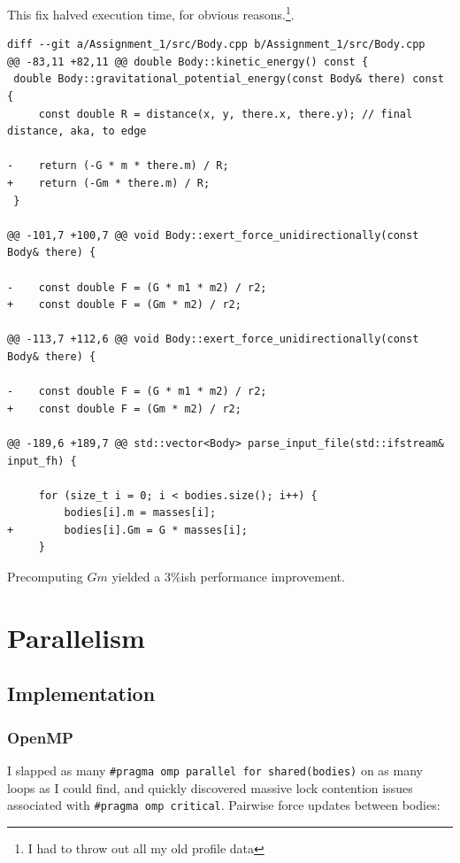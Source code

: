 \documentclass[11pt,a4paper]{article}
\begin{document}
This fix halved execution time, for obvious reasons.\footnote{I had to throw out all my old profile data}.

\begin{verbatim}
diff --git a/Assignment_1/src/Body.cpp b/Assignment_1/src/Body.cpp
@@ -83,11 +82,11 @@ double Body::kinetic_energy() const {
 double Body::gravitational_potential_energy(const Body& there) const {
     const double R = distance(x, y, there.x, there.y); // final distance, aka, to edge

-    return (-G * m * there.m) / R;
+    return (-Gm * there.m) / R;
 }

@@ -101,7 +100,7 @@ void Body::exert_force_unidirectionally(const Body& there) {

-    const double F = (G * m1 * m2) / r2;
+    const double F = (Gm * m2) / r2;

@@ -113,7 +112,6 @@ void Body::exert_force_unidirectionally(const Body& there) {

-    const double F = (G * m1 * m2) / r2;
+    const double F = (Gm * m2) / r2;

@@ -189,6 +189,7 @@ std::vector<Body> parse_input_file(std::ifstream& input_fh) {

     for (size_t i = 0; i < bodies.size(); i++) {
         bodies[i].m = masses[i];
+        bodies[i].Gm = G * masses[i];
     }

\end{verbatim}

Precomputing $Gm$ yielded a 3\%ish performance improvement.

\section*{Parallelism}
\subsection*{Implementation}
\subsubsection*{OpenMP}

I slapped as many \texttt{\#pragma omp parallel for shared(bodies)} on as many loops as I could find, and quickly discovered massive lock contention issues associated with \texttt{\#pragma omp critical}. Pairwise force updates between bodies:
\end{document}

